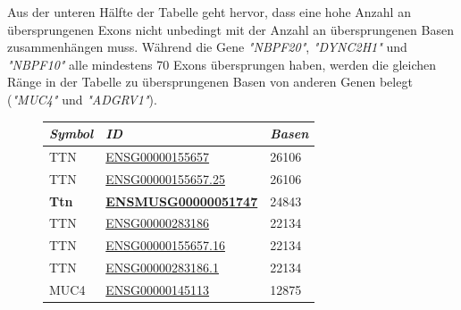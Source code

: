 \documentclass[12pt]{article}
\begin{document}
Aus der unteren Hälfte der Tabelle geht hervor, dass eine hohe Anzahl an übersprungenen Exons nicht unbedingt mit 
der Anzahl an übersprungenen Basen zusammenhängen muss. Während die Gene \textit{"NBPF20"}, \textit{"DYNC2H1"} und \textit{"NBPF10"}
alle mindestens 70 Exons übersprungen haben, werden die gleichen Ränge in der Tabelle zu übersprungenen Basen von anderen 
Genen belegt (\textit{"MUC4"} und \textit{"ADGRV1"}).

\begin{figure}[htbp]
	\centering
	\begin{minipage}{0.45\textwidth}
		\centering
		\begin{tabular}{l|l|l}
			\textit{\textbf{Symbol}} & \textit{\textbf{ID}}                                                                                                                      & \textit{\textbf{Basen}} \\\hline
			TTN                      & \href{https://asia.ensembl.org/Homo_sapiens/Gene/Summary?db=core;g=ENSG00000155657;r=2:178525989-178830802}{ENSG00000155657}              & 26106                   \\
			TTN                      & \href{https://asia.ensembl.org/Homo_sapiens/Gene/Summary?db=core;g=ENSG00000155657;r=2:178525989-178830802}{ENSG00000155657.25}           & 26106                   \\
			\textbf{Ttn}                      & \href{https://asia.ensembl.org/Mus_musculus/Gene/Summary?db=core;g=ENSMUSG00000051747;r=2:76534324-76812891}{\textbf{ENSMUSG00000051747}} & 24843                   \\
			TTN                      & \href{https://asia.ensembl.org/Homo_sapiens/Gene/Idhistory?g=ENSG00000283186}{ENSG00000283186}                                            & 22134                   \\
			TTN                      & \href{https://asia.ensembl.org/Homo_sapiens/Gene/Summary?db=core;g=ENSG00000155657;r=2:178525989-178830802}{ENSG00000155657.16}           & 22134                   \\
			TTN                      & \href{https://asia.ensembl.org/Homo_sapiens/Gene/Idhistory?g=ENSG00000283186}{ENSG00000283186.1}                                          & 22134                   \\
			MUC4                     & \href{https://asia.ensembl.org/Homo_sapiens/Gene/Summary?db=core;g=ENSG00000145113;r=3:195746765-195811973}{ENSG00000145113}              & 12875                   \\

\end{tabular}
\end{minipage}
\end{figure}
\end{document}
